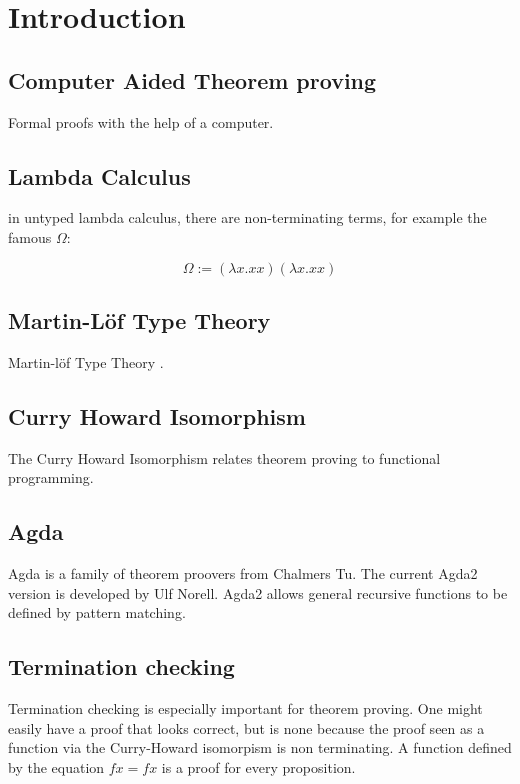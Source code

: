 \chapter{Introduction}
\section {Computer Aided Theorem proving}
Formal proofs with the help of a computer.
\section{Lambda Calculus}

in untyped lambda calculus, there are non-terminating terms, for example the famous \( \Omega \):

\[ \Omega := (\lambda x . x x) (\lambda x . x x) \]


\section{Martin-L\"of Type Theory}
Martin-l\"of Type Theory \cite{mart84}.
\section {Curry Howard Isomorphism}
The Curry Howard Isomorphism relates theorem proving to functional programming.
\section{Agda}

Agda is a family of theorem proovers from Chalmers Tu.
The current Agda2 version is developed by Ulf Norell.
Agda2 allows general recursive functions to be defined by pattern matching.

\section {Termination checking}
Termination checking is especially important for theorem proving.
One might easily have a proof that looks correct, but is none because the proof seen as a function
via the Curry-Howard isomorpism is non terminating.
A function defined by the equation $ f x = f x $ is a proof for every proposition.

